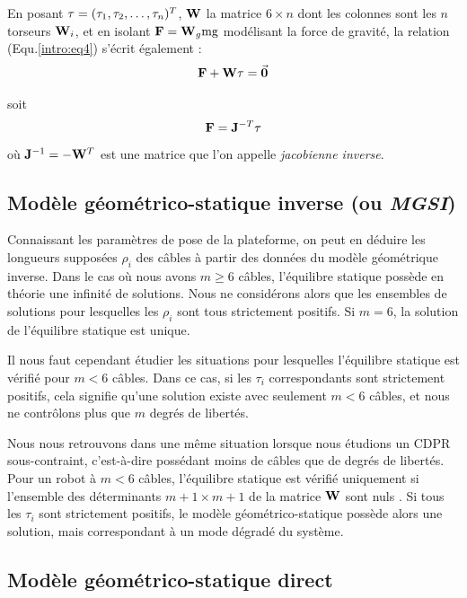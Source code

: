 En posant ${\bf \tau} = (\tau_1, \tau_2, \dots, \tau_n)^T$, ${\bf W}$ la matrice $6 \times n$ dont les colonnes sont les $n$ torseurs ${\bf W}_i$, et en isolant $\mathcal {\bf F} = {\bf W}_g \hbox{mg}$ modélisant la force de gravité, la relation (Equ.\ref{intro:eq4}) s'écrit également :
\begin{equation}
\mathcal {\bf F} + {\bf W} \tau = \vec {\bf 0}
\label{intro:eq5a}
\end{equation}

soit  
\begin{equation}
\mathcal {\bf F} = {\bf J}^{-T} {\bf \tau}
\label{intro:eq5b}
\end{equation}
où ${\bf J}^{-1} = - {\bf W}^T$ est une matrice que l'on appelle {\it jacobienne inverse}.

\subsection{Modèle géométrico-statique inverse (ou {\it MGSI})}

Connaissant les paramètres de pose de la plateforme, on peut en déduire les longueurs supposées $\rho_i$ des câbles à partir des données du modèle géométrique inverse. Dans le cas où nous avons $m \geq 6$ câbles, l'équilibre statique possède en théorie une infinité de solutions. Nous ne considérons alors que les ensembles de solutions pour lesquelles les $\rho_i$ sont tous strictement positifs. Si $m = 6$, la solution de l'équilibre statique est unique.

Il nous faut cependant étudier les situations pour lesquelles l'équilibre statique est vérifié pour $ m < 6$ câbles. Dans ce cas, si les $\tau_i$ correspondants sont strictement positifs, cela signifie qu'une solution existe avec seulement $m < 6$ câbles, et nous ne contrôlons plus que $m$ degrés de libertés.

Nous nous retrouvons dans une même situation lorsque nous étudions un CDPR sous-contraint, c'est-à-dire possédant moins de câbles que de degrés de libertés. Pour un robot à $m < 6$ câbles, l'équilibre statique est vérifié uniquement si l'ensemble des déterminants $m+1 \times m+1$ de la matrice ${\bf W}$ sont nuls \cite{carricato_merlet2013}. Si tous les $\tau_i$ sont strictement positifs, le modèle géométrico-statique possède alors une solution, mais correspondant à un mode dégradé du système.


\subsection{Modèle géométrico-statique direct}

